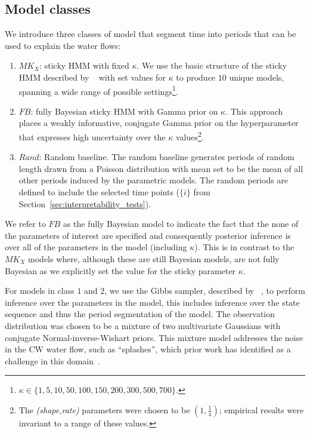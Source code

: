 \documentclass[letterpaper]{article} %
\newcommand{\citename}[1]{\citeauthor{#1}~\shortcite{#1}}
\begin{document}
\subsection{Model classes}
We introduce three classes of model that segment time into periods that can be used to explain the water flows:

\begin{enumerate}
    \item  {${MK_X}$: sticky HMM with fixed $\kappa$.} We use the basic structure of the sticky HMM described by \citename{fox2008hdp} with set values for $\kappa$ to produce $10$ unique models, spanning a wide range of possible settings\footnote{$\kappa \in \{1, 5, 10, 50, 100, 150, 200, 300, 500, 700\}$.}.
    \item  {${FB}$: fully Bayesian sticky HMM with Gamma prior on $\kappa$.} This  approach places a weakly informative, conjugate Gamma prior on the hyperparameter that expresses high uncertainty over the $\kappa$ values\footnote{The \textit{(shape,rate)} parameters were chosen to be $(1,\frac{1}{4})$; empirical results were invariant to a range of these values.}.
    \item  {${Rand}$: Random baseline.} The random baseline generates periods of random length drawn from a Poisson distribution with mean set to be the mean of all other periods induced by the parametric models. The random periods are defined to include the selected time points ($\{i\}$ from Section~\ref{sec:interpretability_tests}).
\end{enumerate}

\noindent We refer to ${FB}$ as the fully Bayesian model to indicate the fact that the none of the parameters of interest are specified and consequently posterior inference is over all of the parameters in the model (including $\kappa$). This is in contrast to the ${MK_X}$ models where, although these are still Bayesian models, are not fully Bayesian as we explicitly set the value for the sticky parameter $\kappa$.

For models in class $1$ and $2$, we use the Gibbs sampler, described by \citename{fox2008hdp}, to perform inference over the parameters in the model, this includes inference over the state sequence and thus the period segmentation of the model. The observation distribution was chosen to be a mixture of two multivariate Gaussians with conjugate Normal-inverse-Wishart priors. This mixture model addresses the noise in the CW water flow, such as ``splashes'', which prior work has identified as a challenge in this domain~\cite{hoernle2018modeling}.
\end{document}
